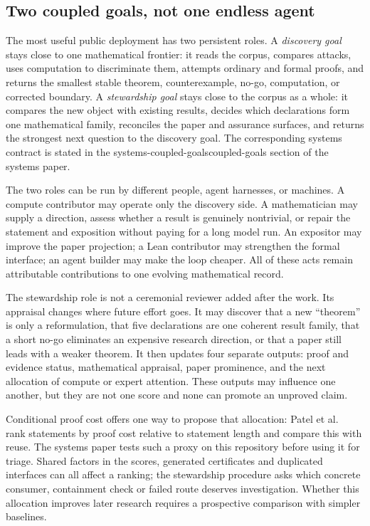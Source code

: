 \documentclass[10pt]{article}
\begin{document}
\subsection*{Two coupled goals, not one endless agent}

The most useful public deployment has two persistent roles.  A
\emph{discovery goal} stays close to one mathematical frontier: it reads the
corpus, compares attacks, uses computation to discriminate them, attempts
ordinary and formal proofs, and returns the smallest stable theorem,
counterexample, no-go, computation, or corrected boundary.  A
\emph{stewardship goal} stays close to the corpus as a whole: it compares the
new object with existing results, decides which declarations form one
mathematical family, reconciles the paper and assurance surfaces, and returns
the strongest next question to the discovery goal.  The corresponding systems
contract is stated in the %
{systems-coupled-goals}{coupled-goals section of the systems paper}.

The two roles can be run by different people, agent harnesses, or machines.
A compute contributor may operate only the discovery side.  A mathematician
may supply a direction, assess whether a result is genuinely nontrivial, or
repair the statement and exposition without paying for a long model run.  An
expositor may improve the paper projection; a Lean contributor may strengthen
the formal interface; an agent builder may make the loop cheaper.  All of
these acts remain attributable contributions to one evolving mathematical
record.

The stewardship role is not a ceremonial reviewer added after the work.  Its
appraisal changes where future effort goes.  It may discover that a new
``theorem'' is only a reformulation, that five declarations are one coherent
result family, that a short no-go eliminates an expensive research direction,
or that a paper still leads with a weaker theorem.  It then updates four
separate outputs: proof and evidence status, mathematical appraisal, paper
prominence, and the next allocation of compute or expert attention.  These
outputs may influence one another, but they are not one score and none can
promote an unproved claim.

Conditional proof cost offers one way to propose that allocation:
Patel et al.~\cite{patel} rank statements by proof cost relative to statement
length and compare this with reuse. The systems paper tests such a proxy on
this repository before using it for triage. Shared factors in the scores,
generated certificates and duplicated interfaces can all affect a ranking;
the stewardship procedure asks which concrete consumer, containment check or
failed route deserves investigation. Whether this allocation improves later
research requires a prospective comparison with simpler baselines.
\end{document}
